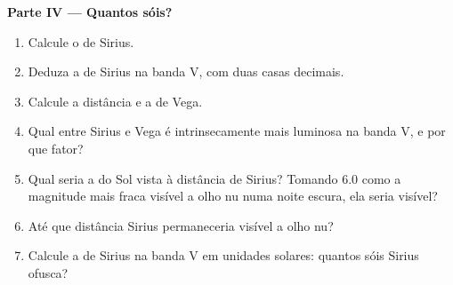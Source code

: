 \begin{problem}
\medskip
\noindent\textbf{Parte IV --- Quantos sóis?}
\begin{enumerate}[resume]
  \item Calcule o  de Sirius.
  \item Deduza a  de Sirius na banda V, com duas casas decimais.
  \item Calcule a distância e a  de Vega.
  \item Qual entre Sirius e Vega é intrinsecamente mais luminosa na banda V, e por que fator?
  \item Qual seria a  do Sol vista à distância de Sirius? Tomando 6.0 como a magnitude mais fraca visível a olho nu numa noite escura, ela seria visível?
  \item Até que distância Sirius permaneceria visível a olho nu?
  \item Calcule a  de Sirius na banda V em unidades solares: quantos sóis Sirius ofusca?
\end{enumerate}
\end{problem}
